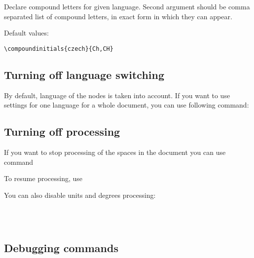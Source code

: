 \documentclass[12pt]{ltxdoc}
\newenvironment{mycode}{
	\medskip%
	\parindent=0pt%
}{\medskip}
\begin{document}
\begin{mycode}
\cmd{\compoundinitials}
\end{mycode}

Declare compound letters for given language. Second argument should be comma 
separated list of compound letters, in exact form in which they can appear.

Default values:

\begin{mycode}
\begin{verbatim}
\compoundinitials{czech}{Ch,CH}
\end{verbatim}
\end{mycode}

\subsection{Turning off language switching}

By default, language of the nodes is taken into account. If you want to use
settings for one language for a whole document, you can use following command:

\begin{mycode}
\cmd{\preventsinglelang}
\end{mycode}

\subsection{Turning off processing}

If you want to stop processing of the spaces in the document you can use command

\begin{mycode}
\cmd{\preventsingleoff}
\end{mycode}

To resume processing, use

\begin{mycode}
\cmd{\preventsingleon}
\end{mycode}

You can also disable units and degrees processing:

\begin{mycode}
  \cmd{\nounits}\\
  \cmd{\nopredegrees}\\
  \cmd{\nosufdegrees}
\end{mycode}

\subsection{Debugging commands}
\begin{mycode}
\cmd{\preventsingledebugon}\par
\cmd{\preventsingledebugoff}
\end{mycode}
\end{document}
